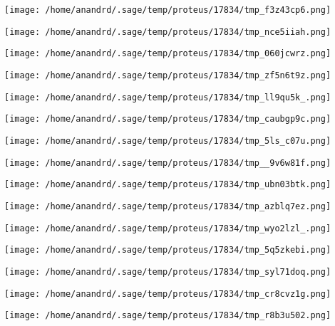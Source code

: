 \documentclass[11pt]{article}
\begin{document}
\begin{center}
\texttt{[image: /home/anandrd/.sage/temp/proteus/17834/tmp\_f3z43cp6.png]}
\end{center}
\begin{center}
\texttt{[image: /home/anandrd/.sage/temp/proteus/17834/tmp\_nce5iiah.png]}
\end{center}
\begin{center}
\texttt{[image: /home/anandrd/.sage/temp/proteus/17834/tmp\_060jcwrz.png]}
\end{center}
\begin{center}
\texttt{[image: /home/anandrd/.sage/temp/proteus/17834/tmp\_zf5n6t9z.png]}
\end{center}
\begin{center}
\texttt{[image: /home/anandrd/.sage/temp/proteus/17834/tmp\_ll9qu5k\_.png]}
\end{center}
\begin{center}
\texttt{[image: /home/anandrd/.sage/temp/proteus/17834/tmp\_caubgp9c.png]}
\end{center}
\begin{center}
\texttt{[image: /home/anandrd/.sage/temp/proteus/17834/tmp\_5ls\_c07u.png]}
\end{center}
\begin{center}
\texttt{[image: /home/anandrd/.sage/temp/proteus/17834/tmp\_\_9v6w81f.png]}
\end{center}
\begin{center}
\texttt{[image: /home/anandrd/.sage/temp/proteus/17834/tmp\_ubn03btk.png]}
\end{center}
\begin{center}
\texttt{[image: /home/anandrd/.sage/temp/proteus/17834/tmp\_azblq7ez.png]}
\end{center}
\begin{center}
\texttt{[image: /home/anandrd/.sage/temp/proteus/17834/tmp\_wyo2lzl\_.png]}
\end{center}
\begin{center}
\texttt{[image: /home/anandrd/.sage/temp/proteus/17834/tmp\_5q5zkebi.png]}
\end{center}
\begin{center}
\texttt{[image: /home/anandrd/.sage/temp/proteus/17834/tmp\_syl71doq.png]}
\end{center}
\begin{center}
\texttt{[image: /home/anandrd/.sage/temp/proteus/17834/tmp\_cr8cvz1g.png]}
\end{center}
\begin{center}
\texttt{[image: /home/anandrd/.sage/temp/proteus/17834/tmp\_r8b3u502.png]}
\end{center}
\end{document}
